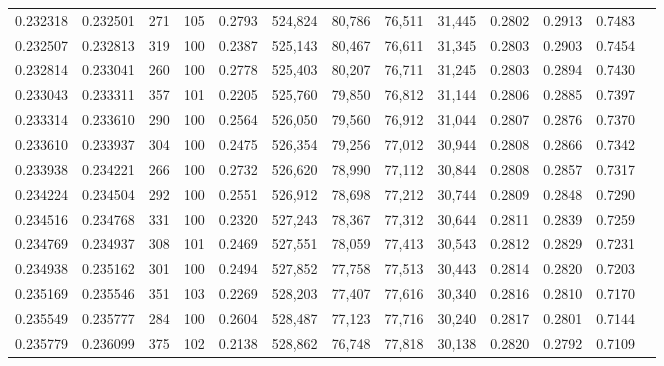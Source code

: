 \begin{tabular}{rrrrrrrrrrrrr}
0.232318 & 0.232501 &   271 & 105 &                                     0.2793 & 524,824 &  80,786 &  76,511 &  31,445 & 0.2802 & 0.2913 & 0.7483 \\
0.232507 & 0.232813 &   319 & 100 &                                     0.2387 & 525,143 &  80,467 &  76,611 &  31,345 & 0.2803 & 0.2903 & 0.7454 \\
0.232814 & 0.233041 &   260 & 100 &                                     0.2778 & 525,403 &  80,207 &  76,711 &  31,245 & 0.2803 & 0.2894 & 0.7430 \\
0.233043 & 0.233311 &   357 & 101 &                                     0.2205 & 525,760 &  79,850 &  76,812 &  31,144 & 0.2806 & 0.2885 & 0.7397 \\
0.233314 & 0.233610 &   290 & 100 &                                     0.2564 & 526,050 &  79,560 &  76,912 &  31,044 & 0.2807 & 0.2876 & 0.7370 \\
0.233610 & 0.233937 &   304 & 100 &                                     0.2475 & 526,354 &  79,256 &  77,012 &  30,944 & 0.2808 & 0.2866 & 0.7342 \\
0.233938 & 0.234221 &   266 & 100 &                                     0.2732 & 526,620 &  78,990 &  77,112 &  30,844 & 0.2808 & 0.2857 & 0.7317 \\
0.234224 & 0.234504 &   292 & 100 &                                     0.2551 & 526,912 &  78,698 &  77,212 &  30,744 & 0.2809 & 0.2848 & 0.7290 \\
0.234516 & 0.234768 &   331 & 100 &                                     0.2320 & 527,243 &  78,367 &  77,312 &  30,644 & 0.2811 & 0.2839 & 0.7259 \\
0.234769 & 0.234937 &   308 & 101 &                                     0.2469 & 527,551 &  78,059 &  77,413 &  30,543 & 0.2812 & 0.2829 & 0.7231 \\
0.234938 & 0.235162 &   301 & 100 &                                     0.2494 & 527,852 &  77,758 &  77,513 &  30,443 & 0.2814 & 0.2820 & 0.7203 \\
0.235169 & 0.235546 &   351 & 103 &                                     0.2269 & 528,203 &  77,407 &  77,616 &  30,340 & 0.2816 & 0.2810 & 0.7170 \\
0.235549 & 0.235777 &   284 & 100 &                                     0.2604 & 528,487 &  77,123 &  77,716 &  30,240 & 0.2817 & 0.2801 & 0.7144 \\
0.235779 & 0.236099 &   375 & 102 &                                     0.2138 & 528,862 &  76,748 &  77,818 &  30,138 & 0.2820 & 0.2792 & 0.7109 \\

\end{tabular}
